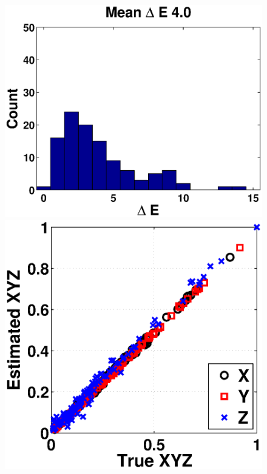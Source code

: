 \documentclass[]{spie}
\begin{document}
\begin{figure}[t]
\begin{center}
\begin{minipage}[b]{0.245\textwidth}
 \includegraphics[width=\textwidth,height=\textwidth]{Fig5/Hist15_Tungsten1_RGBW1_3}
 \includegraphics[width=\textwidth]{Fig5/XYZ_Tungsten1_RGBW1_3}

\end{minipage}
\end{center}
\end{figure}
\end{document}
